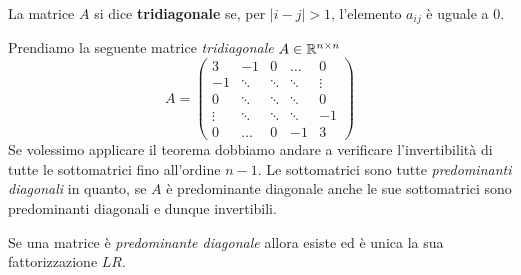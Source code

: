 \begin{definition}
	La matrice $A$ si dice \textbf{tridiagonale} se, per $|i - j| > 1$, l'elemento $a_{ij}$ è uguale a 0.
\end{definition}

\begin{example}
	Prendiamo la seguente matrice \emph{tridiagonale} $A \in \mathbb{R}^{n \times n}$
	\[
		A = \begin{pmatrix}
			3      & -1     & 0      & \dots  & 0      \\
			-1     & \ddots & \ddots & \ddots & \vdots \\
			0      & \ddots & \ddots & \ddots & 0      \\
			\vdots & \ddots & \ddots & \ddots & -1     \\
			0      & \dots  & 0      & -1     & 3
		\end{pmatrix}
	\]
	Se volessimo applicare il teorema dobbiamo andare a verificare l'invertibilità di tutte le sottomatrici fino
	all'ordine $n-1$. Le sottomatrici sono tutte \emph{predominanti diagonali} in quanto, se $A$ è predominante
	diagonale anche le sue sottomatrici sono predominanti diagonali e dunque invertibili.
\end{example}

\begin{theorem}
	Se una matrice è \emph{predominante diagonale} allora esiste ed è unica la sua fattorizzazione $LR$.
\end{theorem}
